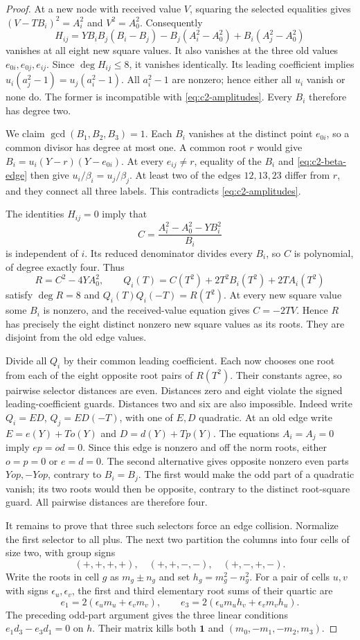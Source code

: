 \begin{proof}
At a new node with received value $V$, squaring the selected equalities
gives $(V-TB_i)^2=A_i^2$ and $V^2=A_0^2$. Consequently
\[
 H_{ij}=YB_iB_j(B_i-B_j)-B_j(A_i^2-A_0^2)+B_i(A_j^2-A_0^2)
\]
vanishes at all eight new square values. It also vanishes at the three
old values $e_{0i},e_{0j},e_{ij}$. Since $\deg H_{ij}\le8$, it vanishes
identically. Its leading coefficient implies
$u_i(a_j^2-1)=u_j(a_i^2-1)$. All $a_i^2-1$ are nonzero; hence either all
$u_i$ vanish or none do. The former is incompatible with
\eqref{eq:c2-amplitudes}. Every $B_i$ therefore has degree two.

We claim $\gcd(B_1,B_2,B_3)=1$. Each $B_i$ vanishes at the distinct point
$e_{0i}$, so a common divisor has degree at most one. A common root $r$
would give $B_i=u_i(Y-r)(Y-e_{0i})$. At every $e_{ij}\ne r$, equality of
the $B_i$ and \eqref{eq:c2-beta-edge} then give
$u_i/\beta_i=u_j/\beta_j$. At least two of the edges $12,13,23$ differ
from $r$, and they connect all three labels. This contradicts
\eqref{eq:c2-amplitudes}.

The identities $H_{ij}=0$ imply that
\[
 C=\frac{A_i^2-A_0^2-YB_i^2}{B_i}
\]
is independent of $i$. Its reduced denominator divides every $B_i$, so
$C$ is polynomial, of degree exactly four. Thus
\[
 R=C^2-4YA_0^2,\qquad
 Q_i(T)=C(T^2)+2T^2B_i(T^2)+2TA_i(T^2)
\]
satisfy $\deg R=8$ and $Q_i(T)Q_i(-T)=R(T^2)$.
At every new square value some $B_i$ is nonzero, and the received-value
equation gives $C=-2TV$. Hence $R$ has precisely the eight distinct
nonzero new square values as its roots. They are disjoint from the old
edge values.

Divide all $Q_i$ by their common leading coefficient. Each now chooses
one root from each of the eight opposite root pairs of $R(T^2)$.
Their constants agree, so pairwise selector distances are even.
Distances zero and eight violate the signed leading-coefficient guards.
Distances two and six are also impossible. Indeed write
$Q_i=ED$, $Q_j=ED(-T)$, with one of $E,D$ quadratic. At an old edge write
$E=e(Y)+To(Y)$ and $D=d(Y)+Tp(Y)$. The equations $A_i=A_j=0$ imply
$ep=od=0$. Since this edge is nonzero and off the norm roots, either
$o=p=0$ or $e=d=0$. The second alternative gives opposite nonzero even
parts $Yop,-Yop$, contrary to $B_i=B_j$. The first would make the odd
part of a quadratic vanish; its two roots would then be opposite,
contrary to the distinct root-square guard. All pairwise distances are
therefore four.

It remains to prove that three such selectors force an edge collision.
Normalize the first selector to all plus. The next two partition the
columns into four cells of size two, with group signs
\[
 (+,+,+,+),\quad (+,+,-,-),\quad (+,-,+,-).
\]
Write the roots in cell $g$ as $m_g\pm n_g$ and set $h_g=m_g^2-n_g^2$.
For a pair of cells $u,v$ with signs $\epsilon_u,\epsilon_v$, the first
and third elementary root sums of their quartic are
\[
 e_1=2(\epsilon_um_u+\epsilon_vm_v),\qquad
 e_3=2(\epsilon_um_uh_v+\epsilon_vm_vh_u).
\]
The preceding odd-part argument gives the three linear conditions
$e_1d_3-e_3d_1=0$ on $h$. Their matrix kills both
$\mathbf1$ and $(m_0,-m_1,-m_2,m_3)$.


\end{proof}
